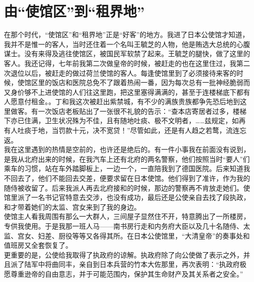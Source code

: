 \fancyhead[RO]{} %
\fancyhead[LE]{} %
\chapter*{由“使馆区”到“租界地”}
\thispagestyle{empty}
在那个时代，“使馆区”和“租界地”正是“好客”的地方。我进了日本公使馆才知道，我并不是惟一的客人，当时还住着一个名叫王毓芝的人物，他是贿选大总统的心腹谋士。没有来得及逃往使馆区，被国民军软禁了起来。王毓芝的腿快，做了这里的客人。我还记得，七年前我第二次做皇帝的时候，被赶走的也在这里住过，我第二次退位以后，被赶走的做过荷兰使馆的客人。每逢使馆里到了必须接待来客的时候，使馆区里的饭店和医院总免不了跟着热闹一番，因为每次总有一批神经脆弱而又身价够不上进使馆的人们往这里跑，把这里塞得满满的，甚至于连楼梯底下都有人愿意付租金。。丁和我这次被赶出紫禁城，有不少的满族贵族都争先恐后地到这里做客。有一次饭店老板贴出了一张很不礼貌的告示：“查本店寄居者过多，楼梯下亦已住满，卫生状况殊为不佳，且有随地吐痰、极不文明者，……兹规定，如再有人吐痰于地，当罚款十元，决不宽贷！”尽管如此，还是有人趋之若鹜，流连忘返。\\

我在这里遇到的热情是空前的，也许还是绝后的。有一件小事我在前面没有说到，是我从北府出来的时候，在我汽车上还有北府的两名警察，他们按照当时“要人”们乘车的习惯，站在车外踏脚板上，一边一个，一直陪我到了德国医院。后来知道我不回去了，他们不能回去交差，便要求留在日本使馆。他们得到了准许，作为我的随侍被收留了。后来我派人再去北府接和的时候，那边的警察再不肯放走她们。使馆里派了一名书记官特意去交涉，也没有成功，最后还是公使亲自去找了段执政，和才带着她们的太监、宫女来到了我的身边。\\

使馆主人看我周围有那么一大群人，三间屋子显然住不开，特意腾出了一所楼房，专供我使用。于是我那一班人马——南书房行走和内务府大臣以及几十名随侍、太监、宫女、妇差、厨役等等又各得其所。在日本公使馆里，“大清皇帝”的奏事处和值班房又全套恢复了。\\

更重要的是，公使给我取得了执政府的谅解。执政府除了向公使做了表示之外，并且派了陆军中将曲同丰，亲自到日本兵营的竹本大佐那里，再次表明：“执政府极愿尊重逊帝的自由意志，并于可能范围内，保护其生命财产及其关系者之安全。”\\

